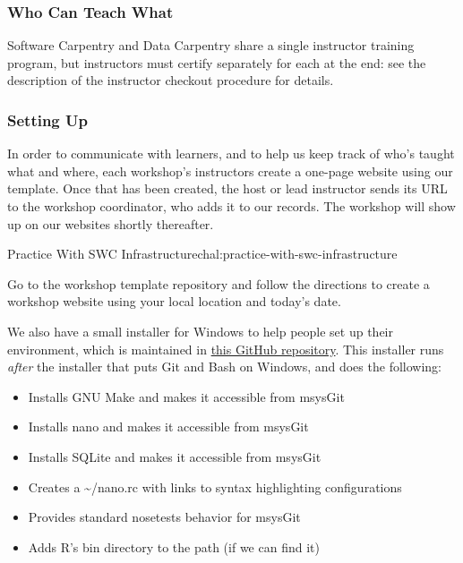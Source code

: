 \subsubsection{Who Can Teach What}\label{who-can-teach-what}

Software Carpentry and Data Carpentry share a single instructor training
program, but instructors must certify separately for each at the end:
see the description of the
instructor checkout procedure for details.

\subsubsection{Setting Up}\label{setting-up}

In order to communicate with learners, and to help us keep track of
who's taught what and where, each workshop's instructors create a
one-page website using our template. Once that has been created, the host or lead instructor sends
its URL to the workshop coordinator, who adds it to our records. The workshop will show up on
our websites shortly thereafter.

\begin{challenge}{Practice With SWC Infrastructure}{chal:practice-with-swc-infrastructure}

Go to the workshop template repository and follow the directions to create a workshop website using
your local location and today's date.
\end{challenge}

We also have
a small installer for Windows to help people set up their environment,
which is maintained in
\href{https://github.com/swcarpentry/windows-installer}{this GitHub
repository}. This installer runs \emph{after} the installer that puts
Git and Bash on Windows, and does the following:

\begin{itemize}
\item
  Installs GNU Make and makes it accessible from msysGit
\item
  Installs nano and makes it accessible from msysGit
\item
  Installs SQLite and makes it accessible from msysGit
\item
  Creates a \textasciitilde{}/nano.rc with links to syntax highlighting
  configurations
\item
  Provides standard nosetests behavior for msysGit
\item
  Adds R's bin directory to the path (if we can find it)
\end{itemize}

